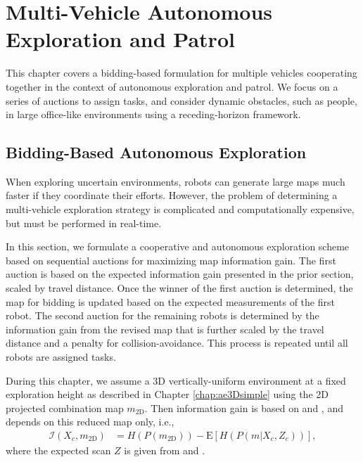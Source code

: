 
\chapter{Multi-Vehicle Autonomous Exploration and Patrol} \label{chap:multivehicle}

This chapter covers a bidding-based formulation for multiple vehicles cooperating together in the context of autonomous exploration and patrol. We focus on a series of auctions to assign tasks, and consider dynamic obstacles, such as people, in large office-like environments using a receding-horizon framework.

\section{Bidding-Based Autonomous Exploration}
\label{sec:BiddingExploration}

When exploring uncertain environments, robots can generate large maps much faster if they coordinate their efforts. However, the problem of determining a multi-vehicle exploration strategy is complicated and computationally expensive, but must be performed in real-time.

In this section, we formulate a cooperative and autonomous exploration scheme based on sequential auctions for maximizing map information gain. The first auction is based on the expected information gain presented in the prior section, scaled by travel distance. Once the winner of the first auction is determined, the map for bidding is updated based on the expected measurements of the first robot. The second auction for the remaining robots is determined by the information gain from the revised map that is further scaled by the travel distance and a penalty for collision-avoidance. This process is repeated until all robots are assigned tasks. 

During this chapter, we assume a 3D vertically-uniform environment at a fixed exploration height as described in Chapter \ref{chap:ae3Dsimple} using the 2D projected combination map $ m_\text{2D}$. Then information gain is based on  and , and depends on this reduced map only, i.e.,
\begin{align}
\label{eqn:expectedInfoGainMap2D}
\mathcal I(X_c,m_\text{2D})&=H(P(m_\text{2D}))-\text{E}\left[H(P(m|X_c,Z_c))\right],
\end{align}
where the expected scan $Z$ is given from  and .


